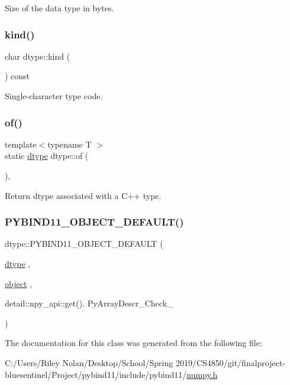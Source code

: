 Size of the data type in bytes. 

\mbox{\label{classdtype_a18ed8c10011953681620744776e2c984}} 
\subsubsection{\texorpdfstring{kind()}{kind()}}
{\footnotesize\ttfamily char dtype\+::kind (\begin{DoxyParamCaption}{ }\end{DoxyParamCaption}) const\hspace{0.3cm}{\ttfamily [inline]}}



Single-\/character type code. 

\mbox{\label{classdtype_a06f34b2e5cc8a17f7038e870b9609191}} 
\subsubsection{\texorpdfstring{of()}{of()}}
{\footnotesize\ttfamily template$<$typename T $>$ \\
static \mbox{\hyperlink{classdtype}{dtype}} dtype\+::of (\begin{DoxyParamCaption}{ }\end{DoxyParamCaption})\hspace{0.3cm}{\ttfamily [inline]}, {\ttfamily [static]}}



Return dtype associated with a C++ type. 

\mbox{\label{classdtype_a44f6cf870b6db329778cd4f14704ec82}} 
\subsubsection{\texorpdfstring{PYBIND11\_OBJECT\_DEFAULT()}{PYBIND11\_OBJECT\_DEFAULT()}}
{\footnotesize\ttfamily dtype\+::\+P\+Y\+B\+I\+N\+D11\+\_\+\+O\+B\+J\+E\+C\+T\+\_\+\+D\+E\+F\+A\+U\+LT (\begin{DoxyParamCaption}\item[{\mbox{\hyperlink{classdtype}{dtype}}}]{,  }\item[{\mbox{\hyperlink{classobject}{object}}}]{,  }\item[{detail\+::npy\+\_\+api\+::get().}]{Py\+Array\+Descr\+\_\+\+Check\+\_\+ }\end{DoxyParamCaption})}



The documentation for this class was generated from the following file\+:\begin{DoxyCompactItemize}
\item 
C\+:/\+Users/\+Riley Nolan/\+Desktop/\+School/\+Spring 2019/\+C\+S4850/git/finalproject-\/bluesentinel/\+Project/pybind11/include/pybind11/\mbox{\hyperlink{numpy_8h}{numpy.\+h}}\end{DoxyCompactItemize}
